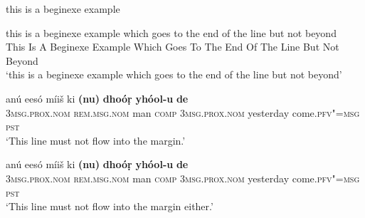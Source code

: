 \begin{exe}
\ex this is a beginexe example
\end{exe}

\begin{exe}
\ex
\gll  this is a beginexe example which goes to the end of the line but not beyond\\
     This Is A Beginexe Example Which Goes To The End Of The Line But Not Beyond\\
\glt  `this is a beginexe example which goes to the end of the line but not beyond'
\end{exe}


\ea 
\label{ex:13-227} 
\gll anú eesó míiš ki \textbf{(nu)} \textbf{dhoóṛ} \textbf{yhóol-u} \textbf{de}\\
\textsc{3msg.prox.nom} \textsc{rem.msg.nom} man \textsc{comp} \textsc{3msg.prox.nom} yesterday come.\textsc{pfv"=msg} \textsc{pst}\\
\glt `This line must not flow into the margin.'
\z
 

\begin{exe} 
\ex
\gll anú eesó míiš ki \textbf{(nu)} \textbf{dhoóṛ} \textbf{yhóol-u} \textbf{de}\\
\textsc{3msg.prox.nom} \textsc{rem.msg.nom} man \textsc{comp} \textsc{3msg.prox.nom} yesterday come.\textsc{pfv"=msg} \textsc{pst}\\
\glt `This line must not flow into the margin either.'
\end{exe}



